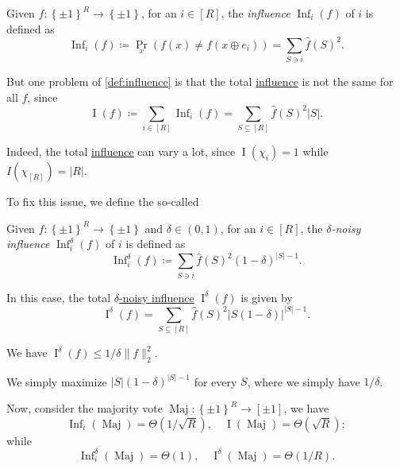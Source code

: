 \begin{definition}[Influence]\label{def:influence}
	Given \(f\colon \left\{ \pm 1 \right\} ^R \to \left\{ \pm 1 \right\} \), for an \(i\in [R]\), the \emph{influence} \(\mathop{\mathrm{Inf}}\nolimits_i(f)\) of \(i\) is defined as
	\[
		\mathop{\mathrm{Inf}}\nolimits_i(f)
		\coloneqq \Pr_{x}(f(x) \neq f(x\oplus e_i))
		= \sum_{S\ni i}\hat{f} (S)^2.
	\]
\end{definition}

But one problem of \autoref{def:influence} is that the total \hyperref[def:influence]{influence} is not the same for all \(f\), since
\[
	\mathop{\mathrm{I}}(f)
	\coloneqq \sum_{i\in [R]} \mathop{\mathrm{Inf}}\nolimits_i(f)
	= \sum_{S \subseteq [R]} \hat{f} (S)^2 \vert S \vert .
\]

\begin{note}
	Indeed, the total \hyperref[def:influence]{influence} can vary a lot, since \(\mathop{\mathrm{I}}(\chi _i) = 1\) while \(I(\chi _{[R]})=\vert R \vert \).
\end{note}

To fix this issue, we define the so-called
\begin{definition}\label{def:noisy-influence}
	Given \(f\colon \left\{ \pm 1 \right\} ^R \to \left\{ \pm 1 \right\} \) and \(\delta \in (0, 1)\), for an \(i\in [R]\), the \emph{\(\delta \)-noisy influence} \(\mathop{\mathrm{Inf}}_i^\delta (f)\) of \(i\) is defined as
	\[
		\mathop{\mathrm{Inf}}\nolimits_i^\delta (f)
		\coloneqq \sum_{S\ni i}\hat{f} (S)^2 (1 - \delta )^{\vert S \vert - 1}.
	\]
\end{definition}

In this case, the total \hyperref[def:noisy-influence]{\(\delta \)-noisy influence} \(\mathop{\mathrm{I}}^\delta (f)\) is given by
\[
	\mathop{\mathrm{I}}\nolimits^\delta (f) = \sum_{S \subseteq [R]} \hat{f} (S)^2 \vert S  (1 - \delta )\vert ^{\vert S \vert -1}.
\]

\begin{claim}
	We have \(\mathop{\mathrm{I}}^\delta (f) \leq 1 / \delta \lVert f \rVert _2^2\).
\end{claim}
\begin{explanation}
	We simply maximize \(\vert S \vert (1 - \delta )^{\vert S \vert -1}\) for every \(S\), where we simply have \(1 / \delta \).
\end{explanation}

Now, consider the majority vote \(\mathop{\mathrm{Maj}}\colon \left\{ \pm 1 \right\} ^R \to \left[ \pm 1 \right] \), we have
\[
	\mathop{\mathrm{Inf}}\nolimits_i(\mathop{\mathrm{Maj}}) = \Theta (1 / \sqrt{R} ),\quad
	\mathop{\mathrm{I}}(\mathop{\mathrm{Maj}}) = \Theta (\sqrt{R} );
\]
while
\[
	\mathop{\mathrm{Inf}}\nolimits_i^\delta (\mathop{\mathrm{Maj}}) = \Theta (1),\quad
	\mathop{\mathrm{I}}\nolimits^\delta (\mathop{\mathrm{Maj}}) = \Theta (1 / R).
\]

